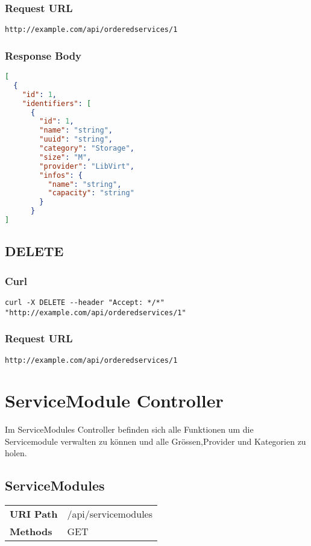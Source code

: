\subsubsection{Request URL}
\begin{lstlisting}[] 
http://example.com/api/orderedservices/1
\end{lstlisting}

\subsubsection{Response Body}
\begin{lstlisting}[language=json] 
[
  {
    "id": 1,
    "identifiers": [
      {
        "id": 1,
        "name": "string",
        "uuid": "string",
        "category": "Storage",
        "size": "M",
        "provider": "LibVirt",
        "infos": {
          "name": "string",
          "capacity": "string"
        }
      }
]
\end{lstlisting}


\subsection{DELETE}
\subsubsection{Curl}
\begin{lstlisting}[] 
curl -X DELETE --header "Accept: */*" "http://example.com/api/orderedservices/1"
\end{lstlisting}

\subsubsection{Request URL}
\begin{lstlisting}[] 
http://example.com/api/orderedservices/1
\end{lstlisting}

\section{ServiceModule Controller}
Im ServiceModules Controller befinden sich alle Funktionen um die 
Servicemodule verwalten zu können und alle Grössen,Provider und Kategorien zu 
holen.
\subsection{ServiceModules}
\begin{tabularx}{\linewidth}{l l}
\textbf{URI Path} & /api/servicemodules\\
\textbf{Methods} & GET\\
\end{tabularx}


